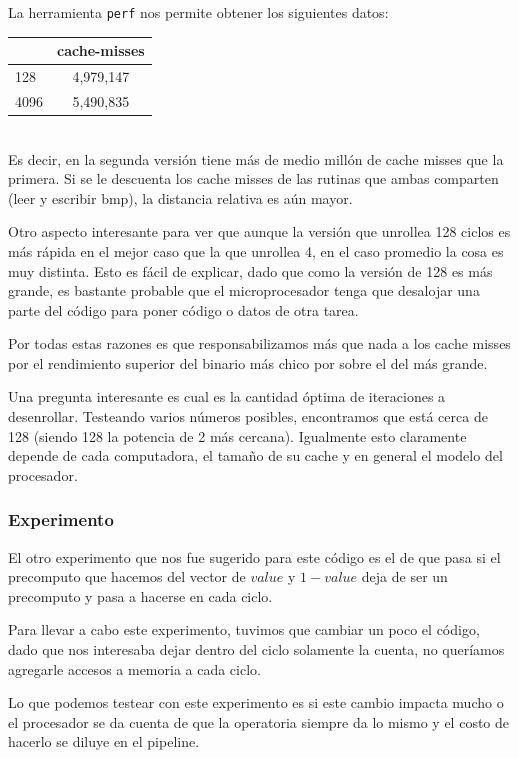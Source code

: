 La herramienta \texttt{perf} nos permite obtener los siguientes datos: \\

\begin{tabular}{ | l | c |  }
  \hline
  
  & cache-misses \\ \hline
  128 & 4,979,147\\ \hline
  4096 & 5,490,835\\ \hline
\end{tabular}\\

Es decir, en la segunda versión tiene más de medio millón de cache misses que la primera. Si se le descuenta los cache misses de las rutinas que ambas comparten (leer y escribir bmp), la distancia relativa es aún mayor.

Otro aspecto interesante para ver que aunque la versión que unrollea 128 ciclos es más rápida en el mejor caso que la que unrollea 4, en el caso promedio la cosa es muy distinta. Esto es fácil de explicar, dado que como la versión de 128 es más grande, es bastante probable que el microprocesador tenga que desalojar una parte del código para poner código o datos de otra tarea.

Por todas estas razones es que responsabilizamos más que nada a los cache misses por el rendimiento superior del binario más chico por sobre el del más grande.

Una pregunta interesante es cual es la cantidad óptima de iteraciones a desenrollar. Testeando varios números posibles, encontramos que está cerca de 128 (siendo 128 la potencia de 2 más cercana). Igualmente esto claramente depende de cada computadora, el tamaño de su cache y en general el modelo del procesador.


\subsubsection*{Experimento}
El otro experimento que nos fue sugerido para este código es el de que pasa si el precomputo que hacemos del vector de $value$ y $1-value$ deja de ser un precomputo y pasa a hacerse en cada ciclo.


Para llevar a cabo este experimento, tuvimos que cambiar un poco el código, dado que nos interesaba dejar dentro del ciclo solamente la cuenta, no queríamos agregarle accesos a memoria a cada ciclo.

Lo que podemos testear con este experimento es si este cambio impacta mucho o el procesador se da cuenta de que la operatoria siempre da lo mismo y el costo de hacerlo se diluye en el pipeline.

